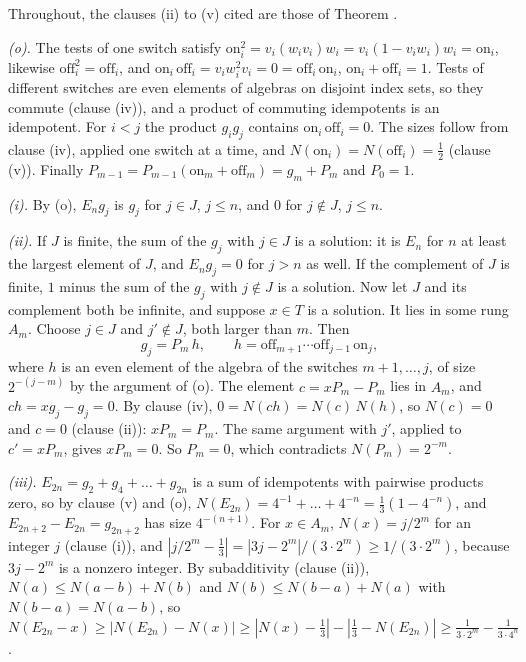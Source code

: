 Throughout, the clauses (ii) to (v) cited are those of Theorem .

\emph{(o).} The tests of one switch satisfy $\mathrm{on}_{i}^{2} = v_{i}(w_{i}v_{i})w_{i} = v_{i}(1 - v_{i}w_{i})w_{i} = \mathrm{on}_{i}$, likewise $\mathrm{off}_{i}^{2} = \mathrm{off}_{i}$, and $\mathrm{on}_{i}\,\mathrm{off}_{i} = v_{i}w_{i}^{2}v_{i} = 0 = \mathrm{off}_{i}\,\mathrm{on}_{i}$, $\mathrm{on}_{i} + \mathrm{off}_{i} = 1$. Tests of different switches are even elements of algebras on disjoint index sets, so they commute (clause (iv)), and a product of commuting idempotents is an idempotent. For $i < j$ the product $g_{i}g_{j}$ contains $\mathrm{on}_{i}\,\mathrm{off}_{i} = 0$. The sizes follow from clause (iv), applied one switch at a time, and $N(\mathrm{on}_{i}) = N(\mathrm{off}_{i}) = \tfrac12$ (clause (v)). Finally $P_{m-1} = P_{m-1}(\mathrm{on}_{m} + \mathrm{off}_{m}) = g_{m} + P_{m}$ and $P_{0} = 1$.

\emph{(i).} By (o), $E_{n}g_{j}$ is $g_{j}$ for $j \in J$, $j \le n$, and $0$ for $j \notin J$, $j \le n$.

\emph{(ii).} If $J$ is finite, the sum of the $g_{j}$ with $j \in J$ is a solution: it is $E_{n}$ for $n$ at least the largest element of $J$, and $E_{n}g_{j} = 0$ for $j > n$ as well. If the complement of $J$ is finite, $1$ minus the sum of the $g_{j}$ with $j \notin J$ is a solution. Now let $J$ and its complement both be infinite, and suppose $x \in T$ is a solution. It lies in some rung $A_{m}$. Choose $j \in J$ and $j' \notin J$, both larger than $m$. Then
\[
g_{j} = P_{m}\,h, \qquad h = \mathrm{off}_{m+1}\cdots\mathrm{off}_{j-1}\,\mathrm{on}_{j},
\]
where $h$ is an even element of the algebra of the switches $m + 1, \dots, j$, of size $2^{-(j - m)}$ by the argument of (o). The element $c = xP_{m} - P_{m}$ lies in $A_{m}$, and $ch = xg_{j} - g_{j} = 0$. By clause (iv), $0 = N(ch) = N(c)\,N(h)$, so $N(c) = 0$ and $c = 0$ (clause (ii)): $xP_{m} = P_{m}$. The same argument with $j'$, applied to $c' = xP_{m}$, gives $xP_{m} = 0$. So $P_{m} = 0$, which contradicts $N(P_{m}) = 2^{-m}$.

\emph{(iii).} $E_{2n} = g_{2} + g_{4} + \dots + g_{2n}$ is a sum of idempotents with pairwise products zero, so by clause (v) and (o), $N(E_{2n}) = 4^{-1} + \dots + 4^{-n} = \tfrac13(1 - 4^{-n})$, and $E_{2n+2} - E_{2n} = g_{2n+2}$ has size $4^{-(n+1)}$. For $x \in A_{m}$, $N(x) = j/2^{m}$ for an integer $j$ (clause (i)), and $|j/2^{m} - \tfrac13| = |3j - 2^{m}|/(3 \cdot 2^{m}) \ge 1/(3 \cdot 2^{m})$, because $3j - 2^{m}$ is a nonzero integer. By subadditivity (clause (ii)), $N(a) \le N(a - b) + N(b)$ and $N(b) \le N(b - a) + N(a)$ with $N(b - a) = N(a - b)$, so $N(E_{2n} - x) \ge |N(E_{2n}) - N(x)| \ge |N(x) - \tfrac13| - |\tfrac13 - N(E_{2n})| \ge \tfrac{1}{3 \cdot 2^{m}} - \tfrac{1}{3 \cdot 4^{n}}$.
